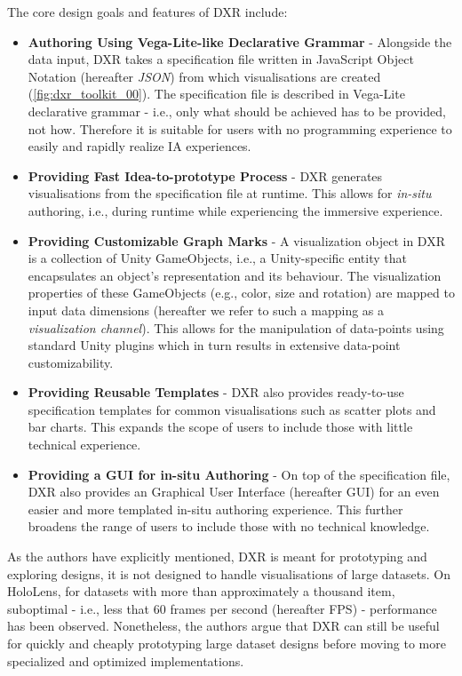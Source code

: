 \documentclass{vgtc}                          %
\begin{document}
\noindent The core design goals and features of DXR include:
\begin{itemize}
    \item \textbf{Authoring Using Vega-Lite-like Declarative Grammar} - Alongside the data input, DXR takes a
    specification file written in JavaScript Object Notation (hereafter \textit{JSON}) from which
    visualisations are created (\autoref{fig:dxr_toolkit_00}). The specification file is described in Vega-Lite declarative grammar \cite{vega_lite} - i.e., only what should be
    achieved has to be provided, not how. Therefore it is suitable for users with no programming experience to
    easily and rapidly realize IA experiences.
    \item \textbf{Providing Fast Idea-to-prototype Process} - DXR generates visualisations from the
    specification file at runtime. This allows for \textit{in-situ} authoring, i.e., during runtime while
    experiencing the immersive experience.
    \item \textbf{Providing Customizable Graph Marks} - A visualization object in DXR is a collection of
    Unity GameObjects, i.e., a Unity-specific entity that encapsulates an object's representation and its
    behaviour. The visualization properties of these GameObjects (e.g., color, size and rotation) are mapped
    to input data dimensions (hereafter we refer to such a mapping as a \textit{visualization channel}).
    This allows for the manipulation of data-points using standard Unity plugins which in turn results in
    extensive data-point customizability.
    \item \textbf{Providing Reusable Templates} - DXR also provides ready-to-use specification templates for
    common visualisations such as scatter plots and bar charts. This expands the scope of users to include
    those with little technical experience.
	\item \textbf{Providing a GUI for in-situ Authoring} - On top of the specification file, DXR also
    provides an Graphical User Interface (hereafter GUI) for an even easier and more templated in-situ
        authoring experience. This further broadens the range of users to include those with no technical knowledge.
\end{itemize}

\medskip

\noindent As the authors have explicitly mentioned, DXR is meant for prototyping and exploring designs, it is
not designed to handle visualisations of large datasets. On HoloLens, for datasets with more than
approximately a thousand item, suboptimal - i.e., less that 60 frames per second (hereafter FPS) -
performance has been observed. Nonetheless, the authors argue that DXR can still be useful for quickly and
cheaply prototyping large dataset designs before moving to more specialized and optimized implementations.
\end{document}
